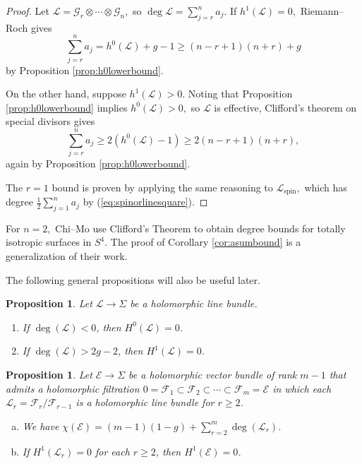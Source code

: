 \documentclass[11pt]{article}
\newtheorem{prop}[theorem]{Proposition}
\theoremstyle{definition}
\numberwithin{equation}{section}
\begin{document}
\begin{proof}
    Let $\mathcal{L} = \mathcal{G}_r \otimes \cdots \otimes \mathcal{G}_n,$ so $\deg \mathcal{L} = \sum_{j=r}^n a_j.$ If $h^1(\mathcal{L}) = 0,$ Riemann--Roch gives
    \begin{equation*}
        \sum_{j=r}^n a_j = h^0(\mathcal{L}) + g - 1 \geq (n-r+1)(n+r) + g
    \end{equation*}
    by Proposition \ref{prop:h0lowerbound}. 
    
    On the other hand, suppose $h^1(\mathcal{L}) > 0.$ Noting that Proposition \ref{prop:h0lowerbound} implies $h^0(\mathcal{L}) > 0,$ so $\mathcal{L}$ is effective, Clifford's theorem on special divisors \cite[\S2.3]{GriffHarrBook78} gives
    \begin{equation*}
        \sum_{j=r}^n a_j \geq 2(h^0(\mathcal{L})-1) \geq 2 (n-r+1)(n+r),
    \end{equation*}
    again by Proposition \ref{prop:h0lowerbound}.

    The $r=1$ bound is proven by applying the same reasoning to $\mathcal{L}_{\mathrm{spin}},$ which has degree $\tfrac{1}{2} \sum_{j=1}^n a_j$ by (\ref{eq:spinorlinesquare}).
\end{proof}

For $n=2,$ Chi--Mo \cite{ChiMo96} use Clifford's Theorem to obtain degree bounds for totally isotropic surfaces in $S^4.$ The proof of Corollary \ref{cor:asumbound} is a generalization of their work.

The following general propositions will also be useful later.

\begin{prop}\label{prop:degreecohomobounds}
Let $\mathcal{L} \to \Sigma$ be a holomorphic line bundle.
	\begin{enumerate}
		\item If $\deg(\mathcal{L}) < 0$, then $H^0(\mathcal{L}) = 0$.
		\item If $\deg(\mathcal{L}) > 2g - 2$, then $H^1(\mathcal{L}) = 0$.
	\end{enumerate}
\end{prop}

\begin{prop} \label{prop:Filtration-General} Let $\mathcal{E} \to \Sigma$ be a holomorphic vector bundle of rank $m-1$ that admits a holomorphic filtration $0 = \mathcal{F}_1 \subset \mathcal{F}_2 \subset \cdots \subset \mathcal{F}_m = \mathcal{E}$ in which each $\mathcal{L}_r = \mathcal{F}_r/\mathcal{F}_{r-1}$ is a holomorphic line bundle for $r \geq 2$.
	\begin{enumerate}[(a)]
		\item We have $\chi(\mathcal{E}) = (m-1)(1-g) + \sum_{r = 2}^m \deg(\mathcal{L}_r)$.  
		\item If $H^1(\mathcal{L}_r) = 0$ for each $r \geq 2$, then $H^1(\mathcal{E}) = 0$.
	\end{enumerate}
\end{prop}
\end{document}

